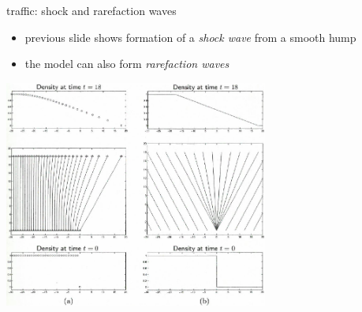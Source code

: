\documentclass[10pt,hyperref,dvipsnames]{beamer}
\begin{document}
\begin{frame}{traffic: shock and rarefaction waves}

\begin{itemize}
\item previous slide shows formation of a \emph{shock wave} from a smooth hump
\item the model can also form \emph{rarefaction waves}
\end{itemize}

\begin{center}
\includegraphics[width=0.65\textwidth]{figs/leveque11p3}
\end{center}
\end{frame}
\end{document}
